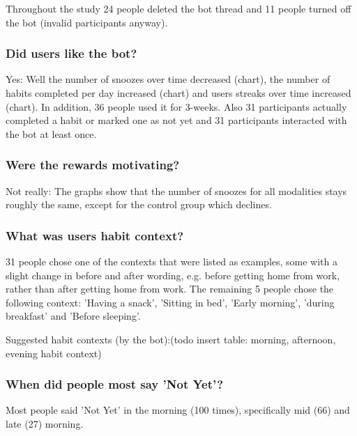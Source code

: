 Throughout the study 24 people deleted the bot thread and 11 people turned off the bot (invalid participants anyway).

\subsubsection*{Did users like the bot?}
Yes: Well the number of snoozes over time decreased (chart), the number of habits completed per day increased (chart) and users streaks over time increased (chart). In addition, 36 people used it for 3-weeks. Also 31 participants actually completed a habit or marked one as not yet and 31 participants interacted with the bot at least once.

\subsubsection*{Were the rewards motivating?}
Not really: The graphs show that the number of snoozes for all modalities stays roughly the same, except for the control group which declines.


\subsubsection*{What was users habit context?}
31 people chose one of the contexts that were listed as examples, some with a slight change in before and after wording, e.g. before getting home from work, rather than after getting home from work. The remaining 5 people chose the following context: 'Having a snack', 'Sitting in bed', 'Early morning', 'during breakfast' and 'Before sleeping'.

Suggested habit contexts (by the bot):(todo insert table: morning, afternoon, evening habit context)





\subsubsection*{When did people most say 'Not Yet'?}
Most people said 'Not Yet' in the morning (100 times), specifically mid (66) and late (27) morning.



